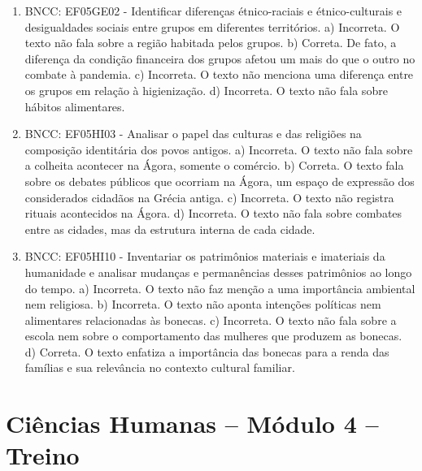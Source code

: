 \begin{enumerate}
\item
BNCC: EF05GE02 - Identificar diferenças étnico-raciais e étnico-culturais e
desigualdades sociais entre grupos em diferentes territórios.
a) Incorreta. O texto não fala sobre a região habitada pelos grupos.
b) Correta. De fato, a diferença da condição financeira dos grupos
afetou um mais do que o outro no combate à pandemia.
c) Incorreta. O texto não menciona uma diferença entre os grupos em relação à
higienização.
d) Incorreta. O texto não fala sobre hábitos alimentares.

\item
BNCC: EF05HI03 - Analisar o papel das culturas e das religiões na composição
identitária dos povos antigos.
a) Incorreta. O texto não fala sobre a colheita acontecer na Ágora,
somente o comércio.
b) Correta. O texto fala sobre os debates públicos que ocorriam na
Ágora, um espaço de expressão dos considerados cidadãos na Grécia
antiga.
c) Incorreta. O texto não registra rituais acontecidos na Ágora.
d) Incorreta. O texto não fala sobre combates entre as cidades, mas da
estrutura interna de cada cidade.

\item
BNCC: EF05HI10 - Inventariar os patrimônios materiais e imateriais da
humanidade e analisar mudanças e permanências desses patrimônios ao
longo do tempo.
a) Incorreta. O texto não faz menção a uma importância ambiental nem
religiosa.
b) Incorreta. O texto não aponta intenções políticas nem alimentares
relacionadas às bonecas.
c) Incorreta. O texto não fala sobre a escola nem sobre o comportamento
das mulheres que produzem as bonecas.
d) Correta. O texto enfatiza a importância das bonecas para a renda das
famílias e sua relevância no contexto cultural familiar.
\end{enumerate}

\section*{Ciências Humanas – Módulo 4 – Treino}

